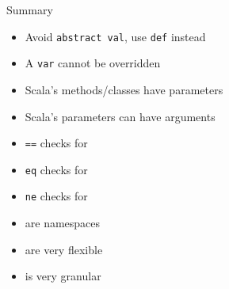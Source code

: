 \begin{frame}[fragile]{Summary}
\begin{itemize}
  \item \alert{Avoid} \lstinline!abstract val!, use \lstinline!def! instead
  \item A \lstinline!var! cannot be overridden
  \item Scala's methods/classes have  parameters
  \item Scala's parameters can have  arguments
  \item \lstinline!==! checks for 
  \item \lstinline!eq! checks for 
  \item \lstinline!ne! checks for 
  \item {} are namespaces
  \item {} are very flexible
  \item {} is very granular
\end{itemize}
\end{frame}